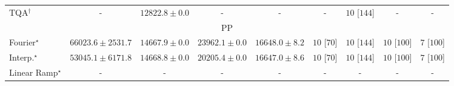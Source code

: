 \begin{tabular}{l|cccc|cccc|}
TQA$^\dagger$ & {\cellcolor[HTML]{000000}} \color[HTML]{F1F1F1} {\cellcolor{white}} \color{black} - & {\cellcolor[HTML]{FFFACA}} \color[HTML]{000000} $12822.8\pm 0.0$ & {\cellcolor[HTML]{000000}} \color[HTML]{F1F1F1} {\cellcolor{white}} \color{black} - & {\cellcolor[HTML]{000000}} \color[HTML]{F1F1F1} {\cellcolor{white}} \color{black} - & {\cellcolor[HTML]{000000}} \color[HTML]{F1F1F1} {\cellcolor{white}} \color{black} - & {\cellcolor[HTML]{49006A}} \color[HTML]{F1F1F1} $10$ [$144$] & {\cellcolor[HTML]{000000}} \color[HTML]{F1F1F1} {\cellcolor{white}} \color{black} - & {\cellcolor[HTML]{000000}} \color[HTML]{F1F1F1} {\cellcolor{white}} \color{black} - \\
\cline{1-9}
\multicolumn{9}{c}{\rule{0pt}{8pt}PP} \\
\midrule
Fourier$^\star$ & {\cellcolor[HTML]{004529}} \color[HTML]{F1F1F1} $66023.6\pm 2531.7$ & {\cellcolor[HTML]{F8FCBD}} \color[HTML]{000000} $14667.9\pm 0.0$ & {\cellcolor[HTML]{D0EC9F}} \color[HTML]{000000} $23962.1\pm 0.0$ & {\cellcolor[HTML]{F2FAB5}} \color[HTML]{000000} $16648.0\pm 8.2$ & {\cellcolor[HTML]{49006A}} \color[HTML]{F1F1F1} $10$ [$70$] & {\cellcolor[HTML]{49006A}} \color[HTML]{F1F1F1} $10$ [$144$] & {\cellcolor[HTML]{49006A}} \color[HTML]{F1F1F1} $10$ [$100$] & {\cellcolor[HTML]{CD238F}} \color[HTML]{F1F1F1} $7$ [$100$] \\
Interp.$^\star$ & {\cellcolor[HTML]{1C7E40}} \color[HTML]{F1F1F1} $53045.1\pm 6171.8$ & {\cellcolor[HTML]{F8FCBD}} \color[HTML]{000000} $14668.8\pm 0.0$ & {\cellcolor[HTML]{E3F4AA}} \color[HTML]{000000} $20205.4\pm 0.0$ & {\cellcolor[HTML]{F2FAB5}} \color[HTML]{000000} $16647.0\pm 8.6$ & {\cellcolor[HTML]{49006A}} \color[HTML]{F1F1F1} $10$ [$70$] & {\cellcolor[HTML]{49006A}} \color[HTML]{F1F1F1} $10$ [$144$] & {\cellcolor[HTML]{49006A}} \color[HTML]{F1F1F1} $10$ [$100$] & {\cellcolor[HTML]{CD238F}} \color[HTML]{F1F1F1} $7$ [$100$] \\
Linear Ramp$^\star$ & {\cellcolor[HTML]{000000}} \color[HTML]{F1F1F1} {\cellcolor{white}} \color{black} - & {\cellcolor[HTML]{000000}} \color[HTML]{F1F1F1} {\cellcolor{white}} \color{black} - & {\cellcolor[HTML]{000000}} \color[HTML]{F1F1F1} {\cellcolor{white}} \color{black} - & {\cellcolor[HTML]{000000}} \color[HTML]{F1F1F1} {\cellcolor{white}} \color{black} - & {\cellcolor[HTML]{000000}} \color[HTML]{F1F1F1} {\cellcolor{white}} \color{black} - & {\cellcolor[HTML]{000000}} \color[HTML]{F1F1F1} {\cellcolor{white}} \color{black} - & {\cellcolor[HTML]{000000}} \color[HTML]{F1F1F1} {\cellcolor{white}} \color{black} - & {\cellcolor[HTML]{000000}} \color[HTML]{F1F1F1} {\cellcolor{white}} \color{black} - \\

\end{tabular}
